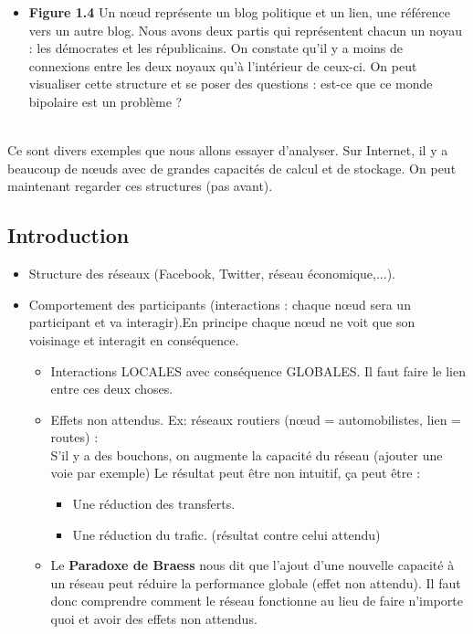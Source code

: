 \begin{itemize}
	\item \textbf{Figure 1.4} Un nœud représente un blog politique et un lien, une référence vers un autre blog. Nous avons deux partis qui représentent chacun un noyau : les démocrates et les républicains. On constate qu'il y a moins de connexions entre les deux noyaux qu'à l'intérieur de ceux-ci. On peut visualiser cette structure et se poser des questions : est-ce que ce monde bipolaire est un problème ?\\\
\end{itemize}

Ce sont divers exemples que nous allons essayer d'analyser. Sur Internet, il y a beaucoup de nœuds avec de grandes capacités de calcul et de stockage. On peut maintenant regarder ces structures (pas avant). 
\subsection{Introduction}
\begin{itemize}
\item Structure des réseaux (Facebook, Twitter, réseau économique,...).
\item Comportement des participants (interactions : chaque nœud sera un participant et va interagir).En principe chaque nœud ne voit que son voisinage et interagit en conséquence.
\begin{itemize}


	\item Interactions LOCALES avec conséquence GLOBALES.
	Il faut faire le lien entre ces deux choses.
	\item Effets non attendus. Ex: réseaux routiers (nœud = automobilistes, lien = routes) : \\
	S'il y a des bouchons, on augmente la capacité du réseau (ajouter une voie par exemple)
	Le résultat peut être non intuitif, ça peut être :
	\begin{itemize} 
		\item Une réduction des transferts.
		\item Une réduction du trafic. (résultat contre celui attendu)
	\end{itemize}	
	\item Le \textbf{Paradoxe de Braess} nous dit que l'ajout d'une nouvelle capacité à un réseau peut 	réduire la performance globale (effet non attendu).
Il faut donc comprendre comment le réseau fonctionne au lieu de faire n'importe quoi et avoir des effets non attendus.
\end{itemize}
\end{itemize}
